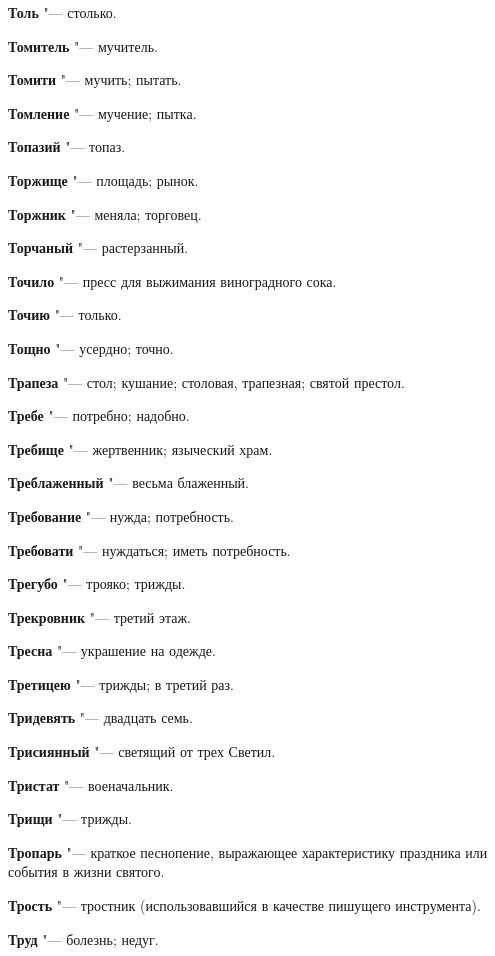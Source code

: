 \begin{mymulticols}
\noindent\textbf{Толь} "--- столько. 

\noindent\textbf{Томитель} "--- мучитель. 

\noindent\textbf{Томити} "--- мучить; пытать. 

\noindent\textbf{Томление} "--- мучение; пытка. 

\noindent\textbf{Топазий} "--- топаз. 

\noindent\textbf{Торжище} "--- площадь; рынок. 

\noindent\textbf{Торжник} "--- меняла; торговец. 

\noindent\textbf{Торчаный} "--- растерзанный. 

\noindent\textbf{Точило} "--- пресс для выжимания виноградного сока. 

\noindent\textbf{Точию} "--- только. 

\noindent\textbf{Тощно} "--- усердно; точно. 

\noindent\textbf{Трапеза} "--- стол; кушание; столовая, трапезная; святой престол. 

\noindent\textbf{Требе} "--- потребно; надобно. 

\noindent\textbf{Требище} "--- жертвенник; языческий храм. 

\noindent\textbf{Треблаженный} "--- весьма блаженный. 

\noindent\textbf{Требование} "--- нужда; потребность. 

\noindent\textbf{Требовати} "--- нуждаться; иметь потребность. 

\noindent\textbf{Трегубо} "--- трояко; трижды. 

\noindent\textbf{Трекровник} "--- третий этаж. 

\noindent\textbf{Тресна} "--- украшение на одежде. 

\noindent\textbf{Третицею} "--- трижды; в третий раз. 

\noindent\textbf{Тридевять} "--- двадцать семь. 

\noindent\textbf{Трисиянный} "--- светящий от трех Светил. 

\noindent\textbf{Тристат} "--- военачальник. 

\noindent\textbf{Трищи} "--- трижды. 

\noindent\textbf{Тропарь} "--- краткое песнопение, выражающее характеристику праздника или события в жизни святого. 

\noindent\textbf{Трость} "--- тростник (использовавшийся в качестве пишущего инструмента). 

\noindent\textbf{Труд} "--- болезнь; недуг. 


\end{mymulticols}
